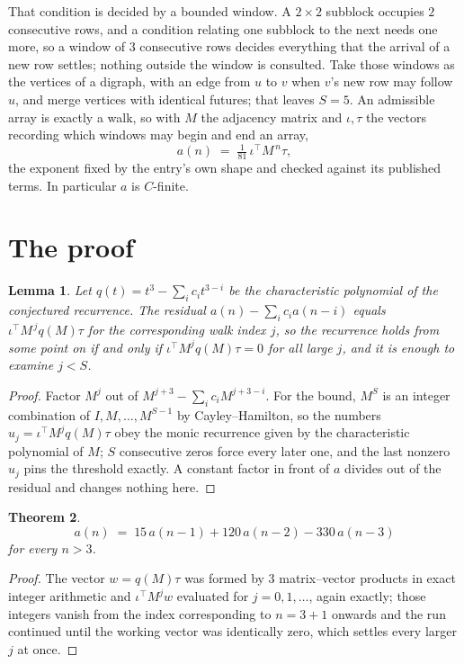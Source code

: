 \documentclass[11pt,a4paper]{article}
\theoremstyle{plain}
\newtheorem{theorem}{Theorem}
\newtheorem{lemma}[theorem]{Lemma}
\theoremstyle{definition}
\begin{document}
That condition is decided by a bounded window. A $2\times2$ subblock occupies $2$ consecutive rows, and a condition relating one subblock to the next needs one more, so a window of $3$ consecutive rows decides everything that the arrival of a new row settles; nothing outside the window is consulted. Take those windows as the vertices of a digraph, with an edge from $u$ to $v$ when $v$'s new row may follow $u$, and merge vertices with identical futures; that leaves $S=5$. An admissible array is exactly a walk, so with $M$ the adjacency matrix and $\iota,\tau$ the vectors recording which windows may begin and end an array,
\[
a(n)\;=\;\tfrac{1}{81}\,\iota^{\!\top}M^{\,n}\tau ,
\]
the exponent fixed by the entry's own shape and checked against its published terms. In
particular $a$ is $C$-finite.

\section{The proof}

\begin{lemma}\label{lem:crit}
Let $q(t)=t^{3}-\sum_i c_it^{3-i}$ be the characteristic polynomial of the
conjectured recurrence. The residual $a(n)-\sum_ic_ia(n-i)$ equals
$\iota^{\!\top}M^{\,j}q(M)\tau$ for the corresponding walk index $j$, so the recurrence
holds from some point on if and only if $\iota^{\!\top}M^{j}q(M)\tau=0$ for all large $j$,
and it is enough to examine $j<S$.
\end{lemma}

\begin{proof}
Factor $M^{j}$ out of $M^{j+3}-\sum_ic_iM^{j+3-i}$. For the bound, $M^{S}$
is an integer combination of $I,M,\dots,M^{S-1}$ by Cayley--Hamilton, so the numbers
$u_j=\iota^{\!\top}M^{j}q(M)\tau$ obey the monic recurrence given by the characteristic
polynomial of $M$; $S$ consecutive zeros force every later one, and the last nonzero $u_j$
pins the threshold exactly. A constant factor in front of $a$ divides out of the residual and
changes nothing here.
\end{proof}

\begin{theorem}
\[
a(n)\;=\;15\,a(n-1) + 120\,a(n-2) - 330\,a(n-3)
\]
for every $n>3$.
\end{theorem}

\begin{proof}
The vector $w=q(M)\tau$ was formed by $3$ matrix--vector products in exact integer
arithmetic and $\iota^{\!\top}M^{j}w$ evaluated for $j=0,1,\dots$, again exactly; those
integers vanish from the index corresponding to $n=3+1$ onwards and the run continued
until the working vector was identically zero, which settles every larger $j$ at once.
\end{proof}
\end{document}
